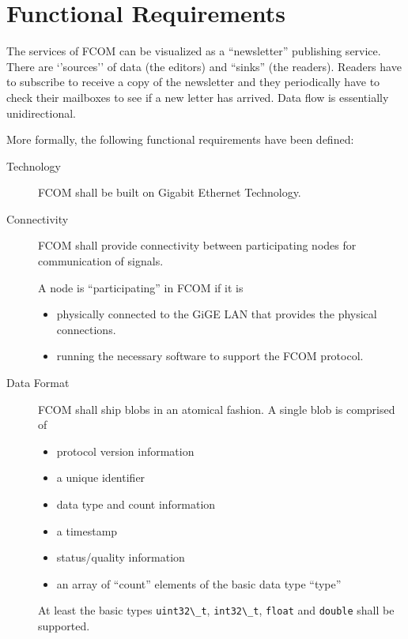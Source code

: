 \documentclass[11pt]{article}
\newcommand{\fcom}{FCOM}
\newcommand{\blob}{blob}
\newcommand{\signal}{signal}
\newcommand{\cstl}[1]{{\lstinline+#1+}}
\begin{document}
\section{Functional Requirements}
The services of \fcom{} can be visualized as a
``newsletter'' publishing service. There are
`'sources'' of data (the editors) and ``sinks''
(the readers). Readers have to subscribe to receive
a copy of the newsletter and they periodically
have to check their mailboxes to see if a new
letter has arrived. Data flow is essentially
unidirectional.

More formally, the following functional requirements have been
defined:
\begin{description}
\item[Technology]   \fcom{} shall be built on Gigabit Ethernet Technology.

\item[Connectivity] \fcom{} shall provide connectivity between participating
                    nodes for communication of \signal{}s.
\label{lbl:participate}

                    A node is ``participating'' in \fcom{} if it is
                    \begin{itemize}
                       \item physically connected to the GiGE LAN that provides
                       the physical connections.
                       \item running the necessary software to support
                       the \fcom{} protocol.
                    \end{itemize}

\item[Data Format]  \fcom{} shall ship \blob{}s in an atomical fashion.
                    A single \blob{} is comprised of
                    \begin{itemize}
                       \item protocol version information
                       \item a unique identifier
                       \item data type and count information
                       \item a timestamp
                       \item status/quality information
                       \item an array of ``count'' elements of the basic
                             data type ``type''
                    \end{itemize}
                    At least the basic types \cstl{uint32\_t}, \cstl{int32\_t},
                    \cstl{float} and \cstl{double} shall be supported.


\end{description}
\end{document}
